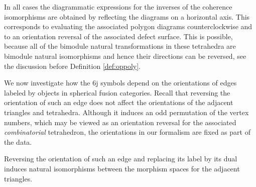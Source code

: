 \documentclass[1.5pt, a4paper]{article}
\begin{document}
In all cases the diagrammatic expressions for the inverses of the coherence isomorphisms 
are obtained  by reflecting  the diagrams on a horizontal axis. This corresponds to evaluating the associated polygon diagrams counterclockwise and to an orientation reversal of the associated defect surface. This is possible, because all of the bimodule natural transformations in these tetrahedra are bimodule natural isomorphisms and hence their directions can be reversed, see the discussion before Definition \ref{def:oppoly}. 



We now investigate how the 6j symbols depend on the orientations of  edges  labeled by objects  in spherical fusion categories. 
Recall that reversing the orientation of such an edge does not affect  the orientations of the adjacent  triangles and tetrahedra. 
Although it induces an odd permutation of the vertex numbers, which may be viewed as an orientation reversal for the associated \emph{combinatorial} tetrahedron, the orientations in our formalism are fixed as part of the data. 

Reversing the orientation of such an edge  and replacing its label by its dual induces natural isomorphisms between the morphism spaces for the adjacent triangles. 
 
\end{document}

